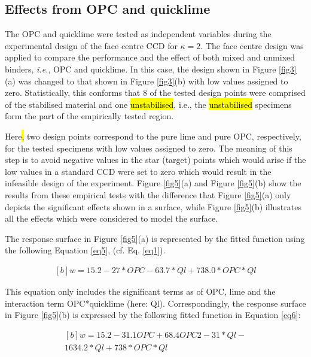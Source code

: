 \documentclass[eprint,
]{actapoly}
\begin{document}
\subsection{Effects from OPC and quicklime}
The OPC and quicklime were tested as independent variables during the  experimental design of the face centre CCD for $\kappa=2$. The face centre design was applied to compare the performance and the effect of both mixed and unmixed binders, \emph{i.e.}, OPC and quicklime. In this case, the design shown in Figure \ref{fig3}(a) was changed to that shown in Figure \ref{fig3}(b) with low values assigned to zero. Statistically, this conforms that 8 of the tested design points were comprised of the stabilised material and one \hl{unstabilised}, i.e., the \hl{unstabilised} specimens form the part of the empirically tested region. 

Here\hl{, }two design points correspond to the pure lime and pure OPC, respectively, for the tested specimens with low values assigned to zero. The meaning of this step is to avoid negative values in the star (target) points which would arise if the low values in a standard CCD were set to zero which would result in the infeasible design of the experiment. Figure \ref{fig5}(a) and Figure \ref{fig5}(b) show the results from these empirical tests with the difference that Figure \ref{fig5}(a) only depicts the significant effects shown in a surface, while Figure \ref{fig5}(b) illustrates all the effects which were considered to model the surface. 

The response surface in Figure \ref{fig5}(a) is represented by the fitted function using the following Equation \ref{eq5}, (cf. Eq. \ref{eq1}). 

\begin{equation}\label{eq5}
\begin{aligned}[b]
w=15.2 -27*OPC-63.7*Ql+738.0*OPC*Ql 
\end{aligned}
\end{equation}

This equation only includes the significant terms as of OPC, lime and the interaction term OPC*quicklime (here: Ql). Correspondingly, the response surface in Figure \ref{fig5}(b) is expressed by the following fitted function in Equation \ref{eq6}:

\begin{equation}\label{eq6}
\begin{aligned}[b]
w=15.2-31.1OPC+68.4OPC2-31*Ql-\\1634.2*Ql+738*OPC*Ql
\end{aligned}
\end{equation}
\end{document}
